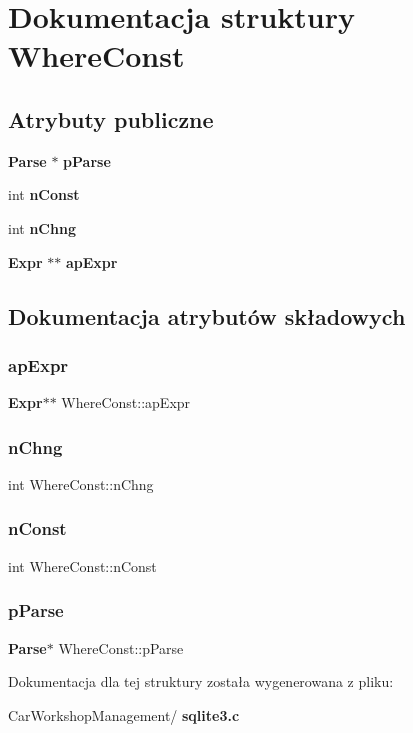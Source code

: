 \section{Dokumentacja struktury Where\+Const}
\label{struct_where_const}
\subsection*{Atrybuty publiczne}
\begin{DoxyCompactItemize}
\item 
\textbf{ Parse} $\ast$ \textbf{ p\+Parse}
\item 
int \textbf{ n\+Const}
\item 
int \textbf{ n\+Chng}
\item 
\textbf{ Expr} $\ast$$\ast$ \textbf{ ap\+Expr}
\end{DoxyCompactItemize}


\subsection{Dokumentacja atrybutów składowych}
\mbox{\label{struct_where_const_ab6b00ac8cb6a4a0edee9b6fc23e6eb1f}} 
\subsubsection{apExpr}
{\footnotesize\ttfamily \textbf{ Expr}$\ast$$\ast$ Where\+Const\+::ap\+Expr}

\mbox{\label{struct_where_const_a35fb4e9d49659ccc8d57eeba59353523}} 
\subsubsection{nChng}
{\footnotesize\ttfamily int Where\+Const\+::n\+Chng}

\mbox{\label{struct_where_const_abdcb8037f1ce219430b75208dc21664b}} 
\subsubsection{nConst}
{\footnotesize\ttfamily int Where\+Const\+::n\+Const}

\mbox{\label{struct_where_const_af77960d6ff1f3e13de8b859971cede2c}} 
\subsubsection{pParse}
{\footnotesize\ttfamily \textbf{ Parse}$\ast$ Where\+Const\+::p\+Parse}



Dokumentacja dla tej struktury została wygenerowana z pliku\+:\begin{DoxyCompactItemize}
\item 
Car\+Workshop\+Management/\textbf{ sqlite3.\+c}\end{DoxyCompactItemize}
